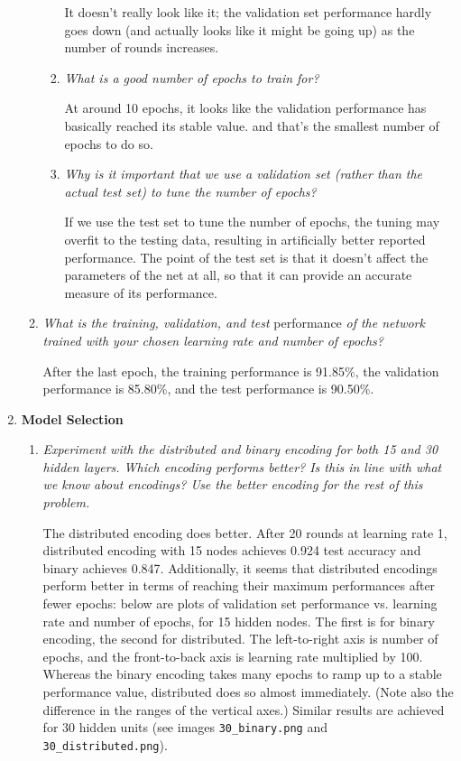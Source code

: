 \documentclass{article}
\begin{document}
\begin{enumerate}
\begin{enumerate}
\begin{enumerate}
        It doesn't really look like it; the validation set performance
        hardly goes down (and actually looks like it might be going
        up) as the number of rounds increases.

      \item \textit{What is a good number of epochs to train for?}

        At around 10 epochs, it looks like the validation performance
        has basically reached its stable value. and that's the
        smallest number of epochs to do so.

      \item \textit{Why is it important that we use a validation set
        (rather than the actual test set) to tune the number of
        epochs?}

        If we use the test set to tune the number of epochs, the
        tuning may overfit to the testing data, resulting in
        artificially better reported performance. The point of the
        test set is that it doesn't affect the parameters of the net
        at all, so that it can provide an accurate measure of its
        performance.

      \end{enumerate}
    \item \textit{What is the training, validation, and test}
      performance \textit{of the network trained with your chosen
        learning rate and number of epochs?}

      After the last epoch, the training performance is 91.85\%, the
      validation performance is 85.80\%, and the test performance is
      90.50\%.
    \end{enumerate}

  \item \textbf{Model Selection}
    \begin{enumerate}
    \item \textit{Experiment with the distributed and binary encoding
      for both 15 and 30 hidden layers. Which encoding performs
      better? Is this in line with what we know about encodings? Use
      the better encoding for the rest of this problem.}

      The distributed encoding does better. After 20 rounds at
      learning rate 1, distributed encoding with 15 nodes achieves
      0.924 test accuracy and binary achieves 0.847. Additionally, it
      seems that distributed encodings perform better in terms of
      reaching their maximum performances after fewer epochs: below
      are plots of validation set performance vs. learning rate and
      number of epochs, for 15 hidden nodes. The first is for binary
      encoding, the second for distributed. The left-to-right axis is
      number of epochs, and the front-to-back axis is learning rate
      multiplied by 100. Whereas the binary encoding takes many epochs
      to ramp up to a stable performance value, distributed does so
      almost immediately. (Note also the difference in the ranges of
      the vertical axes.) Similar results are achieved for 30 hidden
      units (see images {\tt 30\_binary.png} and {\tt
        30\_distributed.png}).


\end{enumerate}
\end{enumerate}
\end{document}
